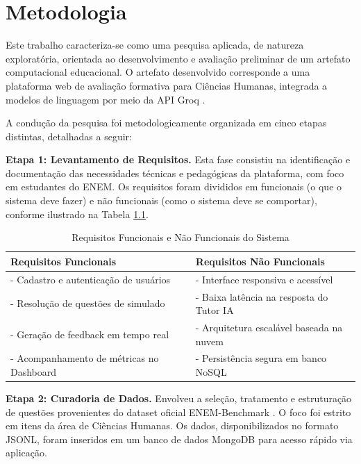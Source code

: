 \documentclass[
12pt,
openright,
oneside,
a4paper,
brazil
]{abntex2}
\begin{document}

\chapter{Metodologia}

Este trabalho caracteriza-se como uma pesquisa aplicada, de natureza exploratória, orientada ao desenvolvimento e avaliação preliminar de um artefato computacional educacional. O artefato desenvolvido corresponde a uma plataforma web de avaliação formativa para Ciências Humanas, integrada a modelos de linguagem por meio da API Groq \cite{groq}.

A condução da pesquisa foi metodologicamente organizada em cinco etapas distintas, detalhadas a seguir:

\textbf{Etapa 1: Levantamento de Requisitos.} Esta fase consistiu na identificação e documentação das necessidades técnicas e pedagógicas da plataforma, com foco em estudantes do ENEM. Os requisitos foram divididos em funcionais (o que o sistema deve fazer) e não funcionais (como o sistema deve se comportar), conforme ilustrado na Tabela \ref{tab:requisitos}.

\begin{table}[H]
    \centering
    \caption{Requisitos Funcionais e Não Funcionais do Sistema}
    \begin{tabular}{|p{}|p{}|}
        \hline
        \textbf{Requisitos Funcionais} & \textbf{Requisitos Não Funcionais} \\
        \hline
        - Cadastro e autenticação de usuários & - Interface responsiva e acessível \\
        - Resolução de questões de simulado & - Baixa latência na resposta do Tutor IA \\
        - Geração de feedback em tempo real & - Arquitetura escalável baseada na nuvem \\
        - Acompanhamento de métricas no Dashboard & - Persistência segura em banco NoSQL \\
        \hline
    \end{tabular}
    \label{tab:requisitos}
\end{table}

\textbf{Etapa 2: Curadoria de Dados.} Envolveu a seleção, tratamento e estruturação de questões provenientes do dataset oficial ENEM-Benchmark \cite{maritaca}. O foco foi estrito em itens da área de Ciências Humanas. Os dados, disponibilizados no formato JSONL, foram inseridos em um banco de dados MongoDB para acesso rápido via aplicação.
\end{document}
